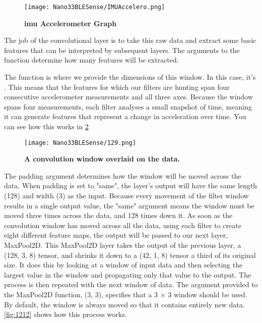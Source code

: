 \begin{figure}[h!]
    \begin{center}
        \texttt{[image: Nano33BLESense/IMUAccelero.png]}
        \caption{\textbf{\ac{imu} Accelerometer Graph \cite{Warden:2020}}}
        \label{fig:IMU}
    \end{center}
\end{figure}

The job of the convolutional layer is to take this raw data and extract some basic features
that can be interpreted by subsequent layers. The arguments to the function  determine how many features will be extracted.

The function  is where we provide the dimensions of this window. In this case, it's .
This means that the features for which our filters are hunting span four consecutive
accelerometer measurements and all three axes. Because the window spans four
measurements, each filter analyses a small snapshot of time, meaning it can generate
features that represent a change in acceleration over time. You can see how this works
in \ref{fig:129} \cite{Warden:2020}

\begin{figure}[h!]
    \texttt{[image: Nano33BLESense/129.png]}
    \caption{\textbf{A convolution window overlaid on the data. \cite{Warden:2020}}}
    \label{fig:129}
\end{figure}

The padding argument determines how the window will be moved across the data.
When padding is set to "same", the layer's output will have the same length (128) and
width (3) as the input. Because every movement of the filter window results in a single
output value, the "same" argument means the window must be moved three times
across the data, and 128 times down it. As soon as the convolution window has moved across all the data, using each filter to create eight different feature maps, the output will be passed to our next layer, MaxPool2D.
This MaxPool2D layer takes the output of the previous layer, a (128, 3, 8) tensor,
and shrinks it down to a (42, 1, 8) tensor a third of its original size. It does this by
looking at a window of input data and then selecting the largest value in the window
and propagating only that value to the output. The process is then repeated with the
next window of data. The argument provided to the MaxPool2D function, (3, 3),
specifies that a 3 × 3 window should be used. By default, the window is always moved
so that it contains entirely new data. \ref{fig:1212} shows how this process works. \cite{Warden:2020}

